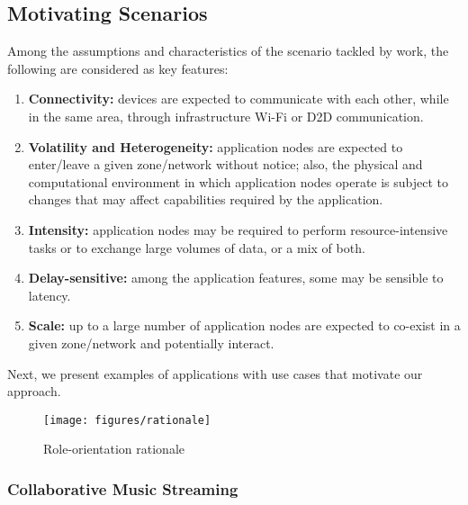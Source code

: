 \subsection{Motivating Scenarios}\label{sec:motivating}

Among the assumptions and characteristics of the scenario tackled by work, the following are considered as key features:

\begin{enumerate}[label=C\arabic*]
	
	\item \textbf{Connectivity:} devices are expected to communicate with each other, while in the same area, through infrastructure Wi-Fi or D2D communication.
	
	\item \textbf{Volatility and Heterogeneity:} application nodes are expected to enter/leave a given zone/network without notice; also, the physical and computational environment in which application nodes operate is subject to changes that may affect capabilities required by the application.
	
	\item \textbf{Intensity:} application nodes may be required to perform resource-intensive tasks or to exchange large volumes of data, or a mix of both.
	
	\item \textbf{Delay-sensitive:} among the application features, some may be sensible to latency.
	
	\item \textbf{Scale:} up to a large number of application nodes are expected to co-exist in a given zone/network and potentially interact.

	
\end{enumerate}

Next, we present examples of applications with use cases that motivate our approach.

\begin{figure*}[t!]
	\centering
	\texttt{[image: figures/rationale]}
	\caption{Role-orientation rationale}
	\label{fig:rationale}
\end{figure*}

\subsubsection{Collaborative Music Streaming}

